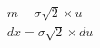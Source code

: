 \documentclass[preview]{standalone}
\begin{document}
\begin{align*}
m - \sigma \sqrt{2} \times u\\dx = \sigma \sqrt{2} \times du\\ \\ \\
\end{align*}
\end{document}

